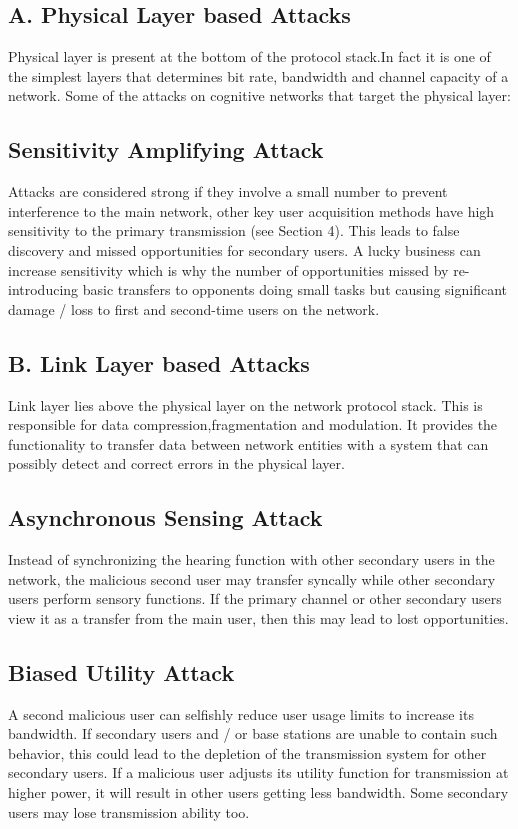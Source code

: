 \documentclass{article}
\begin{document}
\subsection{ A. Physical Layer based Attacks}
Physical layer is present at the bottom of the protocol
stack.In fact it is one of the simplest layers that determines
bit rate, bandwidth and channel capacity of a network.
Some of the attacks on cognitive networks that target the
physical layer:

\newline

\subsection{Sensitivity Amplifying Attack}
Attacks are considered strong if they involve a small
number to prevent interference to the main network, other
key user acquisition methods have high sensitivity to the
primary transmission (see Section 4). This leads to false
discovery and missed opportunities for secondary users. A
lucky business can increase sensitivity which is why the
number of opportunities missed by re-introducing basic
transfers to opponents doing small tasks but causing
significant damage / loss to first and second-time users on
the network.
\subsection{ B. Link Layer based Attacks}
Link layer lies above the physical layer on the network
protocol stack. This is responsible for data
compression,fragmentation and modulation. It provides the
functionality to transfer data between network entities with
a system that can possibly detect and correct errors in the
physical layer.
\newline

\subsection{Asynchronous Sensing Attack}
Instead of synchronizing the hearing function with other
secondary users in the network, the malicious second user
may transfer syncally while other secondary users perform
sensory functions. If the primary channel or other secondary
users view it as a transfer from the main user, then this may
lead to lost opportunities.
 \newline
 
 \subsection{Biased Utility Attack}
 A second malicious user can selfishly reduce user usage
limits to increase its bandwidth. If secondary users and / or
base stations are unable to contain such behavior, this could
lead to the depletion of the transmission system for other
secondary users. If a malicious user adjusts its utility
function for transmission at higher power, it will result in
other users getting less bandwidth. Some secondary users
may lose transmission ability too.
\end{document}
